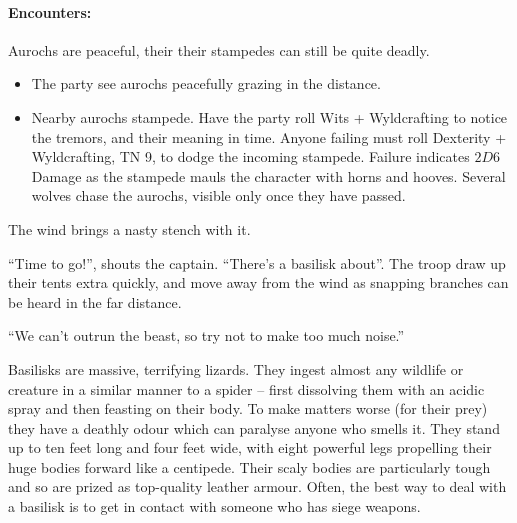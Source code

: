 \begin{multicols}{2}
\begin{boxtext}
\end{boxtext}

\paragraph{Encounters:} Aurochs are peaceful, their their stampedes can still be quite deadly.

\begin{itemize}

  \item
  The party see aurochs peacefully grazing in the distance.
  \item
  Nearby aurochs stampede.
  Have the party roll Wits + Wyldcrafting to notice the tremors, and their meaning in time.
  Anyone failing must roll Dexterity + Wyldcrafting, TN 9, to dodge the incoming stampede.
  Failure indicates $2D6$ Damage as the stampede mauls the character with horns and hooves.
  Several wolves chase the aurochs, visible only once they have passed.

\end{itemize}

\label{basilisk}

\begin{boxtext}

  The wind brings a nasty stench with it.

  ``Time to go!'', shouts the captain.
  ``There's a basilisk about''.
  The troop draw up their tents extra quickly, and move away from the wind as snapping branches can be heard in the far distance.

  ``We can't outrun the beast, so try not to make too much noise.''

\end{boxtext}

Basilisks are massive, terrifying lizards.
They ingest almost any wildlife or creature in a similar manner to a spider -- first dissolving them with an acidic spray and then feasting on their body.
To make matters worse (for their prey) they have a deathly odour which can paralyse anyone who smells it.
They stand up to ten feet long and four feet wide, with eight powerful legs propelling their huge bodies forward like a centipede.
Their scaly bodies are particularly tough and so are prized as top-quality leather armour.
Often, the best way to deal with a basilisk is to get in contact with someone who has siege weapons.

\basilisk


\end{multicols}
